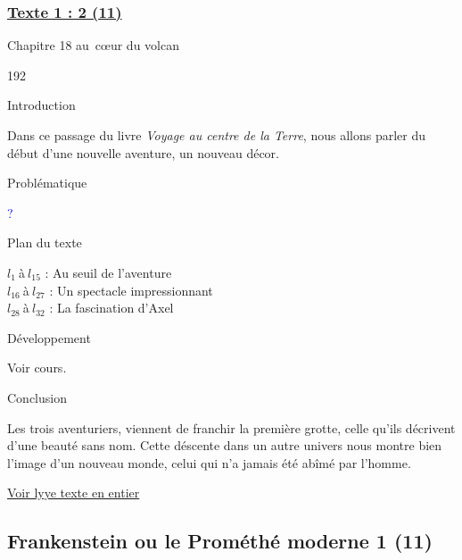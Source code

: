 \documentclass[12pt,a4paper]{article}
\begin{document}
				\subsubsection[Texte 2 (10)]{\textbf{\underline{Texte 1 : 2 (11)}}}
		Chapitre 18 au~c\oe ur du volcan
\begin{dingautolist}{192}

\item Introduction \par
Dans ce passage du livre \textit{Voyage au centre de la Terre}, nous allons parler du début d'une nouvelle aventure, un nouveau décor. 


\item Probl\'ematique \par
	\textcolor{blue}{?}
\item Plan du texte \par
	$l_{1}~$\`a$~l_{15}$ : Au seuil de l'aventure\\
    $l_{16}~$\`a$~l_{27}$ : Un spectacle impressionnant\\
    $l_{28}~$\`a$~l_{32}$ : La fascination d'Axel

\item D\'eveloppement \par
        Voir cours.

\item Conclusion \par
Les trois aventuriers, viennent de franchir la première grotte, celle qu'ils décrivent d'une beauté sans nom. Cette déscente dans un autre univers nous montre bien l'image d'un nouveau monde, celui qui n'a jamais été abîmé par l'homme. 

\end{dingautolist}
\href{.extra/Textes/Chapitre_18_Jules_Vernes.pdf}{Voir lyye texte en entier}

\newpage
\subsection{Frankenstein ou le Prom\'eth\'e moderne 1 (11) }
\end{document}
